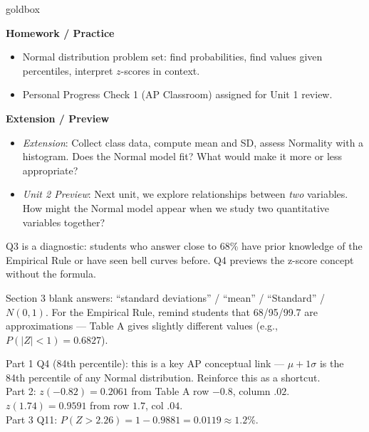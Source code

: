 \documentclass[10pt]{article}
\begin{document}
\boxguard
\begin{skillbox}{goldbox}
\begin{minipage}[t]{0.48\linewidth}
    \textbf{Homework / Practice}
    \begin{itemize}
        \item Normal distribution problem set: find probabilities, find values given percentiles, interpret $z$-scores in context.
        \item Personal Progress Check 1 (AP Classroom) assigned for Unit 1 review.
    \end{itemize}
\end{minipage}
\hfill
\begin{minipage}[t]{0.48\linewidth}
    \textbf{Extension / Preview}
    \begin{itemize}
        \item \textit{Extension}: Collect class data, compute mean and SD, assess Normality with a histogram. Does the Normal model fit? What would make it more or less appropriate?
        \item \textit{Unit 2 Preview}: Next unit, we explore relationships between \textit{two} variables. How might the Normal model appear when we study two quantitative variables together?
    \end{itemize}
\end{minipage}
\end{skillbox}



\boxguard
\begin{teachernote}[Warm-Up]
Q3 is a diagnostic: students who answer close to 68\% have prior knowledge of the Empirical Rule or have seen bell curves before. Q4 previews the z-score concept without the formula.
\end{teachernote}

\boxguard
\begin{teachernote}
Section 3 blank answers: ``standard deviations'' / ``mean'' / ``Standard'' / $N(0,1)$.
For the Empirical Rule, remind students that 68/95/99.7 are approximations — Table A gives slightly different values (e.g., $P(|Z|<1) = 0.6827$).
\end{teachernote}

\boxguard
\begin{teachernote}
Part 1 Q4 (84th percentile): this is a key AP conceptual link — $\mu + 1\sigma$ is the 84th percentile of any Normal distribution. Reinforce this as a shortcut.\\
Part 2: $z(-0.82) = 0.2061$ from Table A row $-0.8$, column $.02$. $z(1.74) = 0.9591$ from row $1.7$, col $.04$.\\
Part 3 Q11: $P(Z > 2.26) = 1 - 0.9881 = 0.0119 \approx 1.2\%$.
\end{teachernote}
\end{document}
